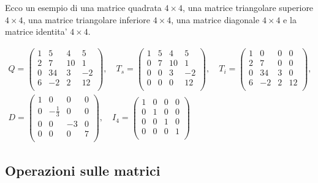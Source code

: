 Ecco un esempio di una matrice quadrata $4 \times 4$, una matrice triangolare superiore $4 \times 4$, una matrice triangolare inferiore $4 \times 4$, una matrice diagonale $4 \times 4$ e la matrice identita' $4 \times 4$.

\begin{gather*}
    Q = \begin{pmatrix}
        1   &5   &4  &5\\
        2   &7   &10 &1\\
        0   &34  &3  &-2\\
        6   &-2  &2  &12\\
    \end{pmatrix}, \quad
    T_s = \begin{pmatrix}
        1   &5  &4  &5\\
        0   &7  &10 &1\\
        0   &0  &3  &-2\\
        0   &0  &0  &12\\
    \end{pmatrix}, \quad
    T_i = \begin{pmatrix}
        1   &0   &0  &0\\
        2   &7   &0  &0\\
        0   &34  &3  &0\\
        6   &-2  &2  &12\\
    \end{pmatrix}, \quad    
    \\D = \begin{pmatrix}
        1   &0              &0  &0\\
        0   &-\frac{1}{3}   &0 &0\\
        0   &0              &-3  &0\\
        0   &0              &0  &7\\
    \end{pmatrix}, \quad
    I_{4} = \begin{pmatrix}
        1   &0  &0  &0\\
        0   &1  &0 &0\\
        0   &0  &1  &0\\
        0   &0  &0  &1\\
    \end{pmatrix}
\end{gather*}

\subsection{Operazioni sulle matrici}

